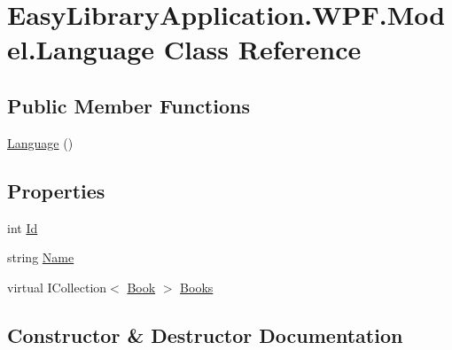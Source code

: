 \hypertarget{class_easy_library_application_1_1_w_p_f_1_1_model_1_1_language}{}\section{Easy\+Library\+Application.\+W\+P\+F.\+Model.\+Language Class Reference}
\label{class_easy_library_application_1_1_w_p_f_1_1_model_1_1_language}
\subsection*{Public Member Functions}
\begin{DoxyCompactItemize}
\item 
\mbox{\hyperlink{class_easy_library_application_1_1_w_p_f_1_1_model_1_1_language_a358fc84d5a7cae7cd0fc718ba457e867}{Language}} ()
\end{DoxyCompactItemize}
\subsection*{Properties}
\begin{DoxyCompactItemize}
\item 
int \mbox{\hyperlink{class_easy_library_application_1_1_w_p_f_1_1_model_1_1_language_a0170b2a520c9e6c7d10472a7d8db9a2d}{Id}}
\item 
string \mbox{\hyperlink{class_easy_library_application_1_1_w_p_f_1_1_model_1_1_language_abe1aaaa68b1a35052cda76dda02d7312}{Name}}
\item 
virtual I\+Collection$<$ \mbox{\hyperlink{class_easy_library_application_1_1_w_p_f_1_1_model_1_1_book}{Book}} $>$ \mbox{\hyperlink{class_easy_library_application_1_1_w_p_f_1_1_model_1_1_language_a8967713448c5870594364fe43b74d32d}{Books}}
\end{DoxyCompactItemize}


\subsection{Constructor \& Destructor Documentation}
\mbox{\label{class_easy_library_application_1_1_w_p_f_1_1_model_1_1_language_a358fc84d5a7cae7cd0fc718ba457e867}} 
